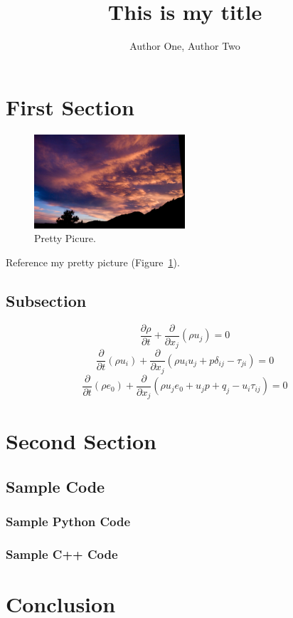 \documentclass{article}
\begin{document}
\title{This is my title}
\author{Author One, Author Two}
\maketitle

\begin{abstract}
  \lipsum[1]
\end{abstract}

\section{First Section}
\lipsum[1]
\begin{figure}
  \centerline{\includegraphics[width=0.5\textwidth]{common/images/wallpaper/mesa_lab_sunset}}
  \caption{Pretty Picure.\label{fig:pretty}}
\end{figure}
Reference my pretty picture (Figure~\ref{fig:pretty}).

\subsection{Subsection}
\lipsum[2]
\begin{equation}
  \frac{\partial \rho}{\partial t} +
  \frac{\partial}{\partial x_{j}} (\rho u_{j}) = 0
\end{equation}
\begin{equation}
  \frac{\partial}{\partial t} (\rho u_{i}) +
  \frac{\partial}{\partial x_{j}} (\rho u_{i} u_{j} + p \delta_{ij} - \tau_{ji} )
  = 0
\end{equation}
\begin{equation}
  \frac{\partial}{\partial t} ( \rho e_{0} ) +
  \frac{\partial}{\partial x_{j}}
  ( \rho u_{j} e_{0} + u_{j} p + q_{j} - u_{i} \tau_{ij} ) = 0
\end{equation}
\lipsum[3]

\section{Second Section}
\lipsum[4]
\subsection{Sample Code}

\subsubsection{Sample Python Code}


\subsubsection{Sample C++ Code}


\section{Conclusion}
\lipsum[5-6]
\clearpage
\layout
\end{document}
